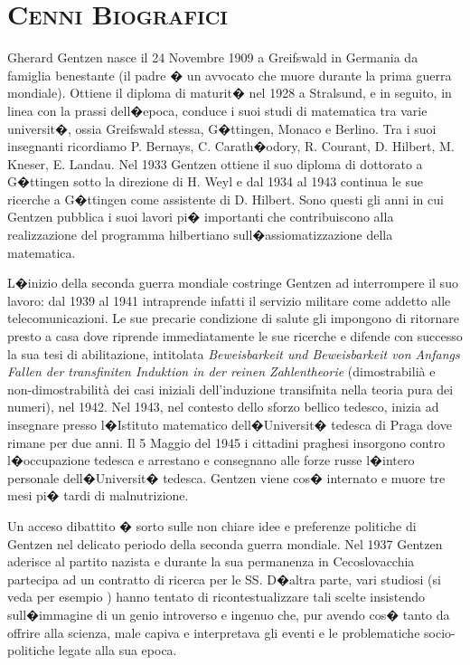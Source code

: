 \documentclass[a4paper,12pt]{aphex}
\begin{document}
\section{\textsc{Cenni Biografici}}

Gherard Gentzen  nasce il 24 Novembre 1909 a Greifswald in Germania da famiglia benestante (il padre � un avvocato che muore durante la prima guerra mondiale). Ottiene il diploma di maturit� nel 1928 a Stralsund, e in seguito, in linea con la prassi dell�epoca, conduce i suoi studi di matematica tra varie universit�, ossia Greifswald stessa, G�ttingen, Monaco e Berlino. Tra i suoi insegnanti ricordiamo P. Bernays, C. Carath�odory, R. Courant, D. Hilbert, M. Kneser, E. Landau.
 Nel 1933 Gentzen ottiene il suo diploma di dottorato a G�ttingen sotto la direzione di H. Weyl e dal 1934 al 1943 continua le sue ricerche a G�ttingen  come assistente di D. Hilbert.  Sono questi gli anni in cui Gentzen pubblica i suoi lavori pi� importanti che contribuiscono alla realizzazione del programma hilbertiano sull�assiomatizzazione della matematica. 

L�inizio della seconda guerra mondiale  costringe Gentzen ad interrompere il suo lavoro: dal 1939 al 1941 intraprende infatti il servizio militare come addetto alle telecomunicazioni. Le sue precarie condizione di salute gli impongono di ritornare presto a casa dove riprende immediatamente le sue ricerche e difende con successo la sua tesi di abilitazione, intitolata  \emph{Beweisbarkeit und Beweisbarkeit von Anfangs Fallen der transfiniten Induktion in der reinen Zahlentheorie} (dimostrabili\`a e non-dimostrabilit\`a dei casi iniziali dell'induzione transifnita nella teoria pura dei numeri),  nel 1942. 
Nel 1943, nel contesto dello sforzo bellico tedesco, inizia ad insegnare presso l�Istituto matematico dell�Universit� tedesca di Praga dove rimane per due anni. Il 5 Maggio del 1945 i cittadini praghesi insorgono contro l�occupazione tedesca e arrestano e consegnano alle forze russe l�intero personale dell�Universit� tedesca. Gentzen viene cos� internato e muore tre mesi pi� tardi di malnutrizione.  

Un acceso dibattito � sorto sulle non chiare idee e preferenze politiche di Gentzen nel delicato periodo della seconda guerra mondiale. Nel 1937 Gentzen aderisce al partito nazista e durante la sua permanenza in Cecoslovacchia partecipa ad un contratto di ricerca per le SS. D�altra parte, vari studiosi (si veda per esempio  \cite{menzler}) hanno tentato di ricontestualizzare tali scelte insistendo sull�immagine di un genio introverso e ingenuo che, pur avendo cos� tanto da offrire alla scienza, male capiva e interpretava gli eventi e le problematiche socio-politiche legate alla sua epoca.
\end{document}
